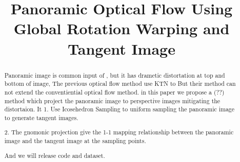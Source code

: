 \documentclass{bmvc2k}
\title{Panoramic Optical Flow Using Global Rotation Warping and Tangent Image}
\begin{document}
\maketitle

\begin{abstract}

Panoramic image is common input of , but it has drametic distortation at top and bottom of image, 
The previous optical flow method use KTN to 
But their method can not extend the conventiential optical flow method.
in this paper we propose a (??) method which project the panoramic image to perspective images mitigating the distortaion.
It 
1. Use Icosehedron Sampling to uniform sampling the panoramic image to generate tangent images.

2. The gnomonic projection give the 1-1 mapping relationship between the panoramic image and the tangent image at the sampling points.

And we will release code and dataset.

\end{abstract}















\end{document}
